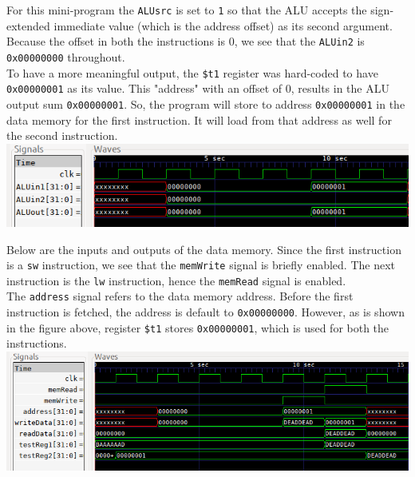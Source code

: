 \documentclass[twocolumn]{article}
\newcommand{\cc}[1]{\texttt{#1}}
\begin{document}
For this mini-program the \cc{ALUsrc} is set to \cc{1} so that the ALU accepts the sign-extended immediate value (which is the address offset) as its second argument. Because the offset in both the instructions is 0, we see that the \cc{ALUin2} is \cc{0x00000000} throughout.  \\

To have a more meaningful output, the \cc{\$t1} register was hard-coded to have \cc{0x00000001} as its value. This "address" with an offset of 0, results in the ALU output sum \cc{0x00000001}. So, the program will store to address \cc{0x00000001} in the data memory for the first instruction. It will load from that address as well for the second instruction.\\

\begingroup
    \centering
    \medskip
    \includegraphics[width=\columnwidth]{Lab-Tex/Lab4-images/p2_2.png}
    \medskip
\endgroup

Below are the inputs and outputs of the data memory. Since the first instruction is a \cc{sw} instruction, we see that the \cc{memWrite} signal is briefly enabled. The next instruction is the \cc{lw} instruction, hence the \cc{memRead} signal is enabled.\\

The \cc{address} signal refers to the data memory address. Before the first instruction is fetched, the address is default to \cc{0x00000000}. However, as is shown in the figure above, register \cc{\$t1} stores \cc{0x00000001}, which is used for both the instructions. \\
 
\begingroup
    \centering
    \medskip
    \includegraphics[width=\columnwidth]{Lab-Tex/Lab4-images/p2_3.png}
    \medskip
\endgroup
\end{document}
